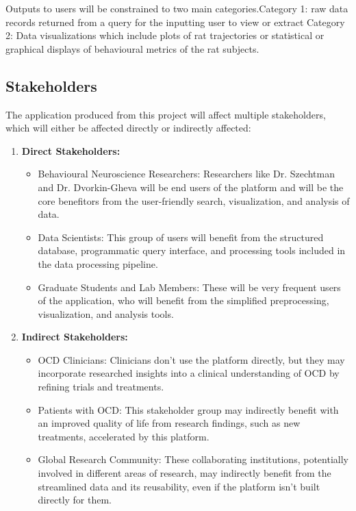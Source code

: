 \documentclass{article}
\begin{document}
\par{Outputs to users will be constrained to two main categories.\newline \newline \indent Category 1: raw data records returned from a query for the inputting user to view or extract
\newline \newline \indent Category 2: Data visualizations which include plots of rat trajectories or statistical or graphical displays of behavioural metrics of the rat subjects.}

\subsection{Stakeholders}

\par{The application produced from this project will affect multiple stakeholders, which will either be affected directly or indirectly affected:}

\begin{enumerate}
  \item \textbf{Direct Stakeholders:}
  \begin{itemize}
    \item {Behavioural Neuroscience Researchers: Researchers like Dr. Szechtman and Dr. Dvorkin-Gheva will be 
    end users of the platform and will be the core benefitors from the user-friendly search, visualization, and analysis of data.}
    \item {Data Scientists: This group of users will benefit from the structured database, programmatic query interface, 
    and processing tools included in the data processing pipeline.}
    \item {Graduate Students and Lab Members: These will be very frequent users of the application, who will benefit from the simplified 
    preprocessing, visualization, and analysis tools.}
  \end{itemize}
  \item \textbf{Indirect Stakeholders:}
  \begin{itemize}
    \item {OCD Clinicians: Clinicians don't use the platform directly, but they may incorporate researched insights into 
    a clinical understanding of OCD by refining trials and treatments.}
    \item {Patients with OCD: This stakeholder group may indirectly benefit with an improved quality of life
     from research findings, such as new treatments, accelerated by this platform.}
    \item {Global Research Community: These collaborating institutions, potentially involved in different areas of research, 
    may indirectly benefit from the streamlined data and its reusability, even if the platform isn't built directly for them.}
  \end{itemize}
\end{enumerate}
\end{document}
